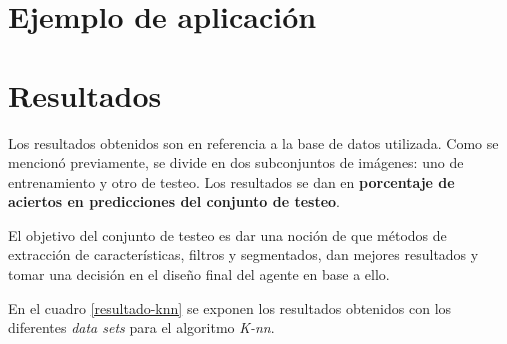 \documentclass[10pt,a4paper]{article}
\begin{document}
\section{Ejemplo de aplicación}

\section{Resultados}
Los resultados obtenidos son en referencia a la base de datos utilizada. Como se mencionó previamente, se divide en dos subconjuntos de imágenes: uno de entrenamiento y otro de testeo. Los resultados se dan en \textbf{porcentaje de aciertos en predicciones del conjunto de testeo}.

El objetivo del conjunto de testeo es dar una noción de que métodos de extracción de características, filtros y segmentados, dan mejores resultados y tomar una decisión en el diseño final del agente en base a ello. 

En el cuadro \ref{resultado-knn} se exponen los resultados obtenidos con los diferentes \textit{data sets} para el algoritmo \textit{K-nn}.
\end{document}
